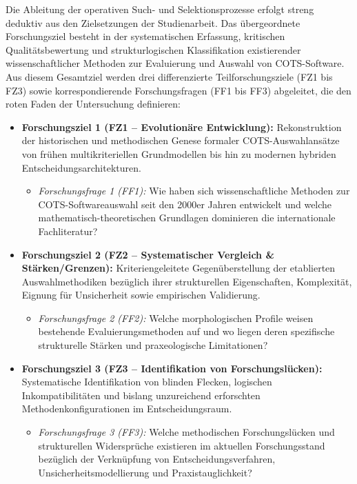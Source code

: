 Die Ableitung der operativen Such- und Selektionsprozesse erfolgt streng deduktiv aus den Zielsetzungen der Studienarbeit. Das übergeordnete Forschungsziel besteht in der systematischen Erfassung, kritischen Qualitätsbewertung und strukturlogischen Klassifikation existierender wissenschaftlicher Methoden zur Evaluierung und Auswahl von COTS-Software. Aus diesem Gesamtziel werden drei differenzierte Teilforschungsziele (FZ1 bis FZ3) sowie korrespondierende Forschungsfragen (FF1 bis FF3) abgeleitet, die den roten Faden der Untersuchung definieren:

\begin{itemize}
    \item \textbf{Forschungsziel 1 (FZ1 -- Evolutionäre Entwicklung):} Rekonstruktion der historischen und methodischen Genese formaler COTS-Auswahlansätze von frühen multikriteriellen Grundmodellen bis hin zu modernen hybriden Entscheidungsarchitekturen.
    \begin{itemize}
        \item \textit{Forschungsfrage 1 (FF1):} Wie haben sich wissenschaftliche Methoden zur COTS-Softwareauswahl seit den 2000er Jahren entwickelt und welche mathematisch-theoretischen Grundlagen dominieren die internationale Fachliteratur?
    \end{itemize}
    \item \textbf{Forschungsziel 2 (FZ2 -- Systematischer Vergleich \& Stärken/Grenzen):} Kriteriengeleitete Gegenüberstellung der etablierten Auswahlmethodiken bezüglich ihrer strukturellen Eigenschaften, Komplexität, Eignung für Unsicherheit sowie empirischen Validierung.
    \begin{itemize}
        \item \textit{Forschungsfrage 2 (FF2):} Welche morphologischen Profile weisen bestehende Evaluierungsmethoden auf und wo liegen deren spezifische strukturelle Stärken und praxeologische Limitationen?
    \end{itemize}
    \item \textbf{Forschungsziel 3 (FZ3 -- Identifikation von Forschungslücken):} Systematische Identifikation von blinden Flecken, logischen Inkompatibilitäten und bislang unzureichend erforschten Methodenkonfigurationen im Entscheidungsraum.
    \begin{itemize}
        \item \textit{Forschungsfrage 3 (FF3):} Welche methodischen Forschungslücken und strukturellen Widersprüche existieren im aktuellen Forschungsstand bezüglich der Verknüpfung von Entscheidungsverfahren, Unsicherheitsmodellierung und Praxistauglichkeit?
    \end{itemize}
\end{itemize}

